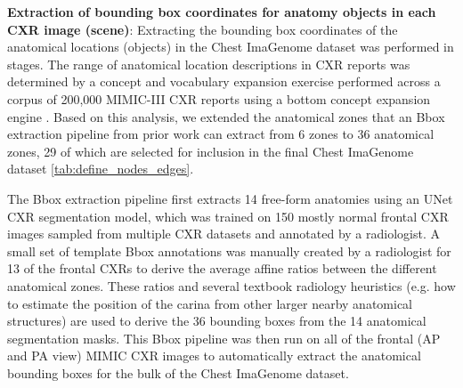 

\textbf{Extraction of bounding box coordinates for anatomy objects in each CXR image (scene)}:
Extracting the bounding box coordinates of the anatomical locations (objects) in the Chest ImaGenome dataset was performed in stages. The range of anatomical location descriptions in CXR reports was determined by a concept and vocabulary expansion exercise performed across a corpus of 200,000 MIMIC-III CXR reports using a bottom concept expansion engine \cite{}. Based on this analysis, we extended the anatomical zones that an Bbox extraction pipeline from prior work can extract from 6 zones \cite{} to 36 anatomical zones, 29 of which are selected for inclusion in the final Chest ImaGenome dataset \ref{tab:define_nodes_edges}. 

The Bbox extraction pipeline first extracts 14 free-form anatomies using an UNet CXR segmentation model, which was trained on 150 mostly normal frontal CXR images sampled from multiple CXR datasets \cite{} and annotated by a radiologist. A small set of template Bbox annotations was manually created by a radiologist for 13 of the frontal CXRs to derive the average affine ratios between the different anatomical zones. These ratios and several textbook radiology heuristics (e.g. how to estimate the position of the carina from other larger nearby anatomical structures) are used to derive the 36 bounding boxes from the 14 anatomical segmentation masks. This Bbox pipeline was then run on all of the frontal (AP and PA view) MIMIC CXR images to automatically extract the anatomical bounding boxes for the bulk of the Chest ImaGenome dataset.

